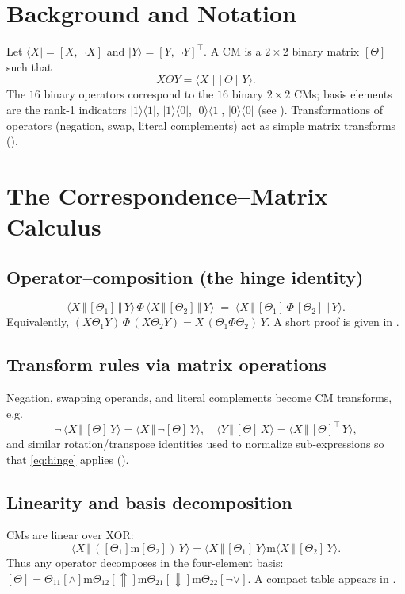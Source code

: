 \documentclass[11pt]{article}
\newcommand{\brrket}[2]{\langle #1 \,\Vert\, #2\rangle}  %
\newcommand{\CM}[1]{[{#1}]}
\newcommand{\xor}{\mathbin{\mathrm{m}}}
\begin{document}
\section{Background and Notation}
\label{sec:background}
Let $\langle X|=[X,\neg X]$ and $|Y\rangle=[Y,\neg Y]^{\top}$. A CM is a $2\times2$ binary matrix $\CM{\Theta}$ such that
\[
X\Theta Y=\brrket{X}{\CM{\Theta}\,Y}.
\]
The $16$ binary operators correspond to the $16$ binary $2\times2$ CMs; basis elements are the rank-1 indicators $|1\rangle\!\langle 1|$, $|1\rangle\!\langle 0|$, $|0\rangle\!\langle 1|$, $|0\rangle\!\langle 0|$ (see ). Transformations of operators (negation, swap, literal complements) act as simple matrix transforms ().

\section{The Correspondence--Matrix Calculus}
\subsection{Operator--composition (the hinge identity)}
\label{sec:hinge}
\begin{equation}
\label{eq:hinge}
\langle X \,\Vert\, \CM{\Theta_1} \,\Vert\, Y\rangle \,\Phi\,
\langle X \,\Vert\, \CM{\Theta_2} \,\Vert\, Y\rangle
\;=\;
\langle X \,\Vert\, \CM{\Theta_1}\,\Phi\,\CM{\Theta_2} \,\Vert\, Y\rangle.
\end{equation}
Equivalently, $(X\Theta_1Y)\,\Phi\,(X\Theta_2Y) = X\,(\Theta_1\Phi\Theta_2)\,Y$.
A short proof is given in .

\subsection{Transform rules via matrix operations}
\label{sec:transforms}
Negation, swapping operands, and literal complements become CM transforms, e.g.
\[
\neg\,\brrket{X}{\CM{\Theta}\,Y}=\brrket{X}{\neg\CM{\Theta}\,Y},\quad
\brrket{Y}{\CM{\Theta}\,X}=\brrket{X}{\CM{\Theta}^{\top}\,Y},
\]
and similar rotation/transpose identities used to normalize sub-expressions so that \eqref{eq:hinge} applies ().

\subsection{Linearity and basis decomposition}
\label{sec:linearity}
CMs are linear over XOR:
\[
\brrket{X}{(\CM{\Theta_1}\xor\CM{\Theta_2})\,Y}
=
\brrket{X}{\CM{\Theta_1}\,Y}\xor\brrket{X}{\CM{\Theta_2}\,Y}.
\]
Thus any operator decomposes in the four-element basis:
\(
\CM{\Theta}=\Theta_{11}\CM{\wedge}\xor \Theta_{12}\CM{\Uparrow}\xor \Theta_{21}\CM{\Downarrow}\xor \Theta_{22}\CM{\neg\vee}.
\)
A compact table appears in .
\end{document}
